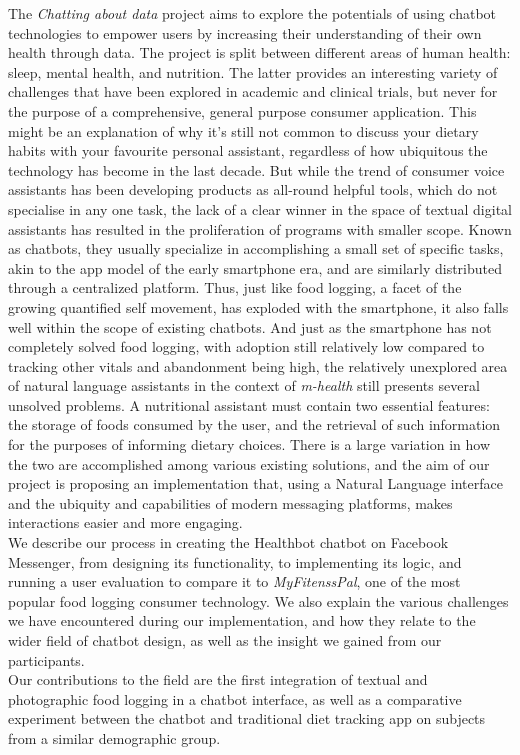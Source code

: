 The \textit{Chatting about data} project aims to explore the potentials of using chatbot technologies to empower users by increasing their understanding of their own health through data. The project is split between different areas of human health: sleep, mental health, and nutrition. The latter provides an interesting variety of challenges that have been explored in academic and clinical trials, but never for the purpose of a comprehensive, general purpose consumer application. This might be an explanation of why it’s still not common to discuss your dietary habits with your favourite personal assistant, regardless of how ubiquitous the technology has become in the last decade. But while the trend of consumer voice assistants has been developing products as all-round helpful tools, which do not specialise in any one task, the lack of a clear winner in the space of textual digital assistants has resulted in the proliferation of programs with smaller scope. Known as chatbots, they usually specialize in accomplishing a small set of specific tasks, akin to the app model of the early smartphone era, and are similarly distributed through a centralized platform. Thus, just like food logging, a facet of the growing quantified self movement, has exploded with the smartphone, it also falls well within the scope of existing chatbots.
And just as the smartphone has not completely solved food logging, with adoption still relatively low compared to tracking other vitals and abandonment being high, the relatively unexplored area of natural language assistants in the context of \textit{m-health} still presents several unsolved problems.
A nutritional assistant must contain two essential features: the storage of foods consumed by the user, and the retrieval of such information for the purposes of informing dietary choices. There is a large variation in how the two are accomplished among various existing solutions, and the aim of our project is proposing an implementation that, using a Natural Language interface and the ubiquity and capabilities of modern messaging platforms, makes interactions easier and more engaging. \\
We describe our process in creating the Healthbot chatbot on Facebook Messenger, from designing its functionality, to implementing its logic, and running a user evaluation to compare it to \textit{MyFitenssPal}, one of the most popular food logging consumer technology. We also explain the various challenges we have encountered during our implementation, and how they relate to the wider field of chatbot design, as well as the insight we gained from our participants. \\
Our contributions to the field are the first integration of textual and photographic food logging in a chatbot interface, as well as a comparative experiment between the chatbot and traditional diet tracking app on subjects from a similar demographic group.
